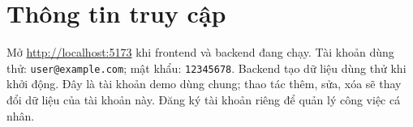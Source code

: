 \section{Thông tin truy cập}

Mở \url{http://localhost:5173} khi frontend và backend đang chạy.
Tài khoản dùng thử: \texttt{user@example.com}; mật khẩu: \texttt{12345678}.
Backend tạo dữ liệu dùng thử khi khởi động. Đây là tài khoản demo dùng chung;
thao tác thêm, sửa, xóa sẽ thay đổi dữ liệu của tài khoản này.
Đăng ký tài khoản riêng để quản lý công việc cá nhân.

